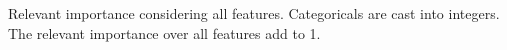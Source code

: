 Relevant importance considering all features. Categoricals are cast into integers. The relevant importance over all features add to 1.
\label{fig:relevantImportanceAll}